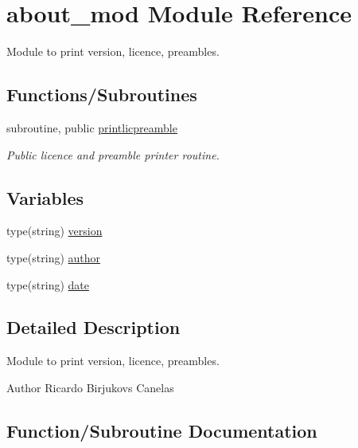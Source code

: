 \hypertarget{namespaceabout__mod}{}\section{about\+\_\+mod Module Reference}
\label{namespaceabout__mod}


Module to print version, licence, preambles.  


\subsection*{Functions/\+Subroutines}
\begin{DoxyCompactItemize}
\item 
subroutine, public \mbox{\hyperlink{namespaceabout__mod_a9fb866e1576b843b42649d84b80f4b52}{printlicpreamble}}
\begin{DoxyCompactList}\small\item\em Public licence and preamble printer routine. \end{DoxyCompactList}\end{DoxyCompactItemize}
\subsection*{Variables}
\begin{DoxyCompactItemize}
\item 
type(string) \mbox{\hyperlink{namespaceabout__mod_af0051041c5a98e3eb7284580236db3a0}{version}}
\item 
type(string) \mbox{\hyperlink{namespaceabout__mod_a7c3a72ae7ba5fc7d8a4bf133605f58c3}{author}}
\item 
type(string) \mbox{\hyperlink{namespaceabout__mod_aaac12f65380fb0f10916b3744d9e5a0b}{date}}
\end{DoxyCompactItemize}


\subsection{Detailed Description}
Module to print version, licence, preambles. 

\begin{DoxyAuthor}{Author}
Ricardo Birjukovs Canelas 
\end{DoxyAuthor}


\subsection{Function/\+Subroutine Documentation}
\mbox{\label{namespaceabout__mod_a9fb866e1576b843b42649d84b80f4b52}} 
